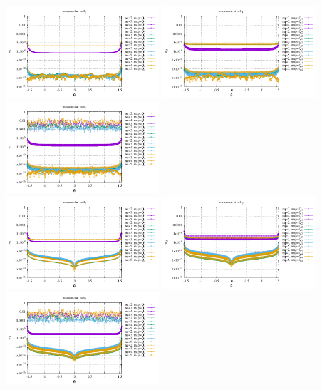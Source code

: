 \begin{center}
\includegraphics[width=5.7cm]{python_codes/fieldstone_152/results/exp1_axisymmetric/sr1_R1}
\includegraphics[width=5.7cm]{python_codes/fieldstone_152/results/exp1_axisymmetric/sr2_R1}
\includegraphics[width=5.7cm]{python_codes/fieldstone_152/results/exp1_axisymmetric/sr3_R1}\\
\includegraphics[width=5.7cm]{python_codes/fieldstone_152/results/exp1_axisymmetric/sr1_R2}
\includegraphics[width=5.7cm]{python_codes/fieldstone_152/results/exp1_axisymmetric/sr2_R2}
\includegraphics[width=5.7cm]{python_codes/fieldstone_152/results/exp1_axisymmetric/sr3_R2}\\
\end{center}


